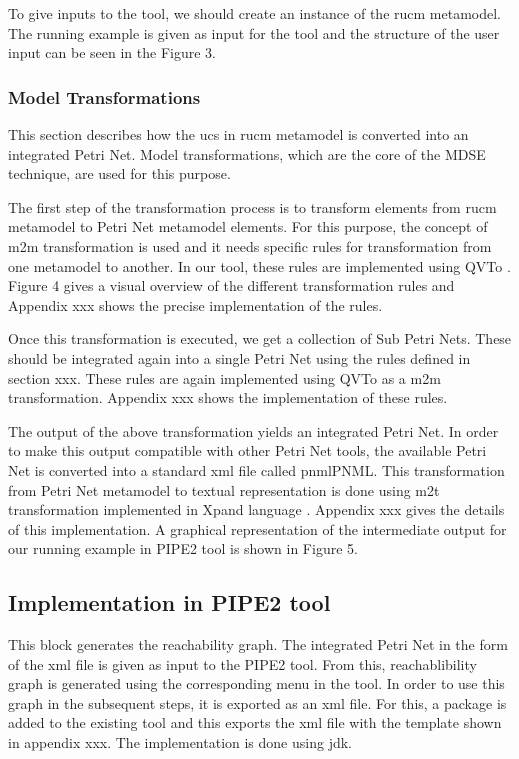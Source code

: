 To give inputs to the tool, we should create an instance of the \gls{rucm} metamodel. The running example is given as input for the tool and the structure of the user input can be seen in the Figure 3.

\subsubsection{Model Transformations}
This section describes how the \gls{ucs} in \gls{rucm} metamodel is converted into an integrated Petri Net. Model transformations, which are the core of the MDSE technique, are used for this purpose.

The first step of the transformation process is to transform elements from \gls{rucm} metamodel to Petri Net metamodel elements. For this purpose, the concept of \gls{m2m} transformation is used and it needs specific rules for transformation from one metamodel to another.  In our tool, these rules are implemented using QVTo \cite{eclipseqvt}. Figure 4 gives a visual overview of the different transformation rules and Appendix xxx shows the precise implementation of the rules. 

Once this transformation is executed, we get a collection of Sub Petri Nets. These should be integrated again into a single Petri Net using the rules defined in section xxx. These rules are again implemented using QVTo as a \gls{m2m} transformation. Appendix xxx shows the implementation of these rules.

The output of the above transformation yields an integrated Petri Net. In order to make this output compatible with other Petri Net tools, the available Petri Net is converted into a standard xml file called \gls{pnml}PNML. This transformation from Petri Net metamodel to textual representation is done using \gls{m2t} transformation implemented in Xpand language \cite{eclipsem2t}. Appendix xxx gives the details of this implementation. A graphical representation of the intermediate output for our running example in PIPE2 tool is shown in Figure 5.

\subsection{Implementation in PIPE2 tool}
This block generates the reachability graph. The integrated Petri Net in the form of the xml file is given as input to the PIPE2 tool. From this, reachablibility graph is generated using the corresponding menu in the tool. In order to use this graph in the subsequent steps, it is exported as an xml file. For this, a package is added to the existing tool and this exports the xml file with the template shown in appendix xxx. The implementation is done using \gls{jdk}.

